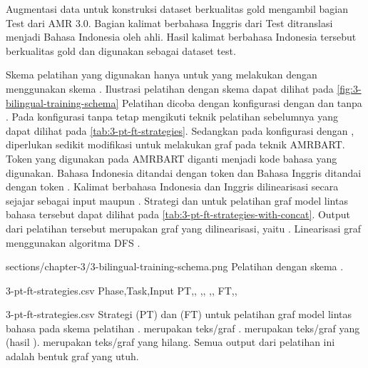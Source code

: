 Augmentasi data untuk konstruksi dataset berkualitas gold mengambil bagian Test  dari AMR 3.0.
Bagian kalimat berbahasa Inggris dari Test  ditranslasi menjadi Bahasa Indonesia oleh ahli.
Hasil kalimat berbahasa Indonesia tersebut berkualitas gold dan digunakan sebagai dataset test.

\newcommand\graphMasked{\codesm{\textcolor[rgb]{0,.33,0}{<g>$g_1$,..[mask]..,$g_m$</g>}}}
\newcommand\graphBarMasked{\codesm{\textcolor[rgb]{0,.33,0}{<g>[mask]</g>}}}
\newcommand\idTagged[1]{\codesm{\textcolor{purple}{<id>#1</id>}}}
\newcommand\enTagged[1]{\codesm{\textcolor{blue}{<en>#1</en>}}}
\newcommand\sTagged[1]{\codesm{\textcolor{purple}{<s>#1</s>}}}

Skema pelatihan yang digunakan hanya untuk yang melakukan \amrparsing{} dengan menggunakan skema .
Ilustrasi pelatihan dengan skema  dapat dilihat pada \cref{fig:3-bilingual-training-schema}
Pelatihan dicoba dengan konfigurasi dengan dan tanpa .
Pada konfigurasi tanpa  tetap mengikuti teknik pelatihan sebelumnya yang dapat dilihat pada \cref{tab:3-pt-ft-strategies}.
Sedangkan pada konfigurasi dengan , diperlukan sedikit modifikasi untuk melakukan \pretraining{} graf pada teknik \gls{AMRBART}.
Token  yang digunakan pada \gls{AMRBART} diganti menjadi kode bahasa yang digunakan.
Bahasa Indonesia ditandai dengan token  dan Bahasa Inggris ditandai dengan token .
Kalimat berbahasa Indonesia dan Inggris dilinearisasi secara sejajar sebagai input \pretraining{} maupun \finetuning{}.
Strategi \pretraining{} dan \finetuning{} untuk pelatihan graf model \amrparsing{} lintas bahasa tersebut dapat dilihat pada \cref{tab:3-pt-ft-strategies-with-concat}.
Output dari pelatihan tersebut merupakan graf \AMR{} yang dilinearisasi, yaitu .
Linearisasi graf menggunakan algoritma \gls{DFS} .

  {sections/chapter-3/3-bilingual-training-schema.png}
  {Pelatihan dengan skema .}

\begin{filecontents*}{3-pt-ft-strategies.csv}
Phase,Task,Input
PT,,\makecell[cl]{\sTagged{[mask]}\graphMasked{}}
,,\makecell[cl]{\sTagged{$a_1$,..,$a_n$}\graphMasked{}}
,,\makecell[cl]{\sTagged{$a_1$,..[mask]..,$a_n$}\graphMasked{}}
FT,,\makecell[cl]{\sTagged{$a_1$,..,$a_n$}\graphMasked{}}
\end{filecontents*}
  {3-pt-ft-strategies.csv}
  {
    Strategi \pretraining{} (PT) dan \finetuning{} (FT) untuk pelatihan graf model \amrparsing{} lintas bahasa pada skema pelatihan .
     merupakan teks/graf .
     merupakan teks/graf yang  (hasil \denoising{}).
     merupakan teks/graf yang hilang.
    Semua output dari pelatihan ini adalah bentuk graf yang utuh.
  }

